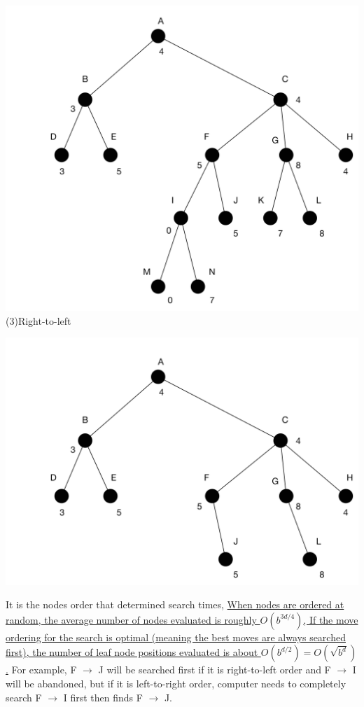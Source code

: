 \documentclass[12pt]{amsart}
\begin{document}
\includegraphics[width=\textwidth]{Problem5b.png}
\newpage
(3)Right-to-left

\includegraphics[width=\textwidth]{Problem5c.png}

It is the nodes order that determined search times, \href{https://en.wikipedia.org/wiki/Alpha\%E2\%80\%93beta_pruning}{When nodes are ordered at random, the average number of nodes evaluated is roughly $O(b^{3d/4}) $, If the move ordering for the search is optimal (meaning the best moves are always searched first), the number of leaf node positions evaluated is about $O(b^{d/2})=O({\sqrt {b^{d}}})$.} For example, F $\to$ J will be searched first if it is right-to-left order and F $\to$ I will be abandoned, but if it is left-to-right order, computer needs to completely search F $\to$ I first then finds F $\to$ J.
\newpage
\end{document}
